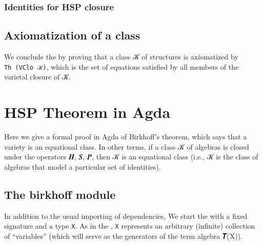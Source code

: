 \documentclass[a4paper,USenglish,cleveref,autoref,thm-restate]{lipics-v2019}
\begin{document}
\subsubsection{Identities for HSP closure}\label{identities-for-hsp-closure}
\begin{code}\end{code}


\subsection{Axiomatization of a class}\label{axiomatization-of-a-class}
We conclude the \closuremodule by proving that a class 𝒦 of structures is axiomatized by \texttt{Th\ (VClo\ 𝒦)}, which is the set of equations satisfied by all members of the varietal closure of 𝒦.
\begin{code}\end{code}

\section{HSP Theorem in Agda}\label{hsp-theorem-in-agda}
Here we give a formal proof in Agda of Birkhoff's theorem, which says that a variety is an equational class. In other terms, if a class 𝒦 of algebras is closed under the operators 𝑯, 𝑺, 𝑷, then 𝒦 is an equational class (i.e., 𝒦 is the class of algebras that model a particular set of identities).

\subsection{The birkhoff module}\label{the-birkhoff-module}
In addition to the usual importing of dependencies, We start the \birkhoffmodule with a fixed signature and a type \texttt{X}. As in the \termsmodule, \texttt{X} represents an arbitrary (infinite) collection of ``variables'' (which will serve as the generators of the term algebra 𝑻(X)).
\begin{code}\end{code}
\end{document}
